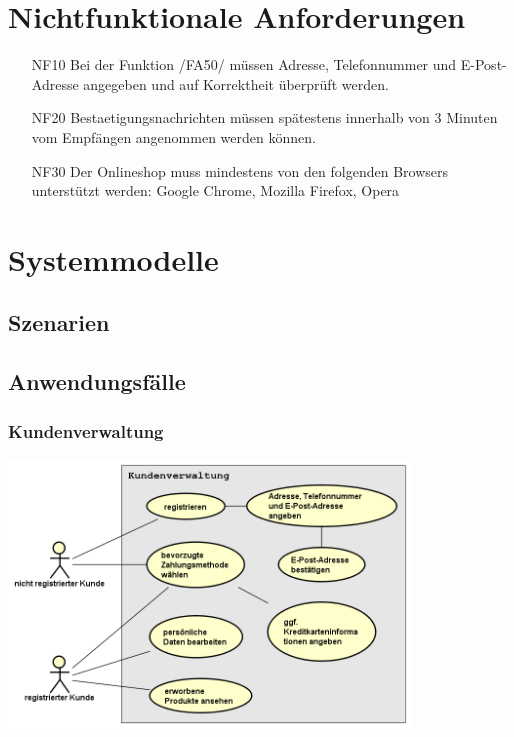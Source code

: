 \documentclass[parskip=full]{scrartcl}
\begin{document}
\section{Nichtfunktionale Anforderungen}
\begin{itemize}[nosep]
\item[NF10] Bei der Funktion /FA50/ müssen Adresse, Telefonnummer und E-Post-Adresse angegeben und auf Korrektheit überprüft werden.
\item[NF20] \gls{Bestaetigungsnachricht}en müssen spätestens innerhalb von 3 Minuten vom Empfängen angenommen werden können.
\item[NF30] Der \gls{Onlineshop} muss mindestens von den folgenden \gls{Browser}s unterstützt werden: Google Chrome, Mozilla Firefox, Opera
\end{itemize}

\section{Systemmodelle}

\subsection{Szenarien}

\subsection{Anwendungsfälle}
\subsubsection{\gls{Kunde}nverwaltung}
\begin{center}
\includegraphics[width=0.8\textwidth]{szenario_kundenverwaltung.png}
\end{center}
\end{document}
